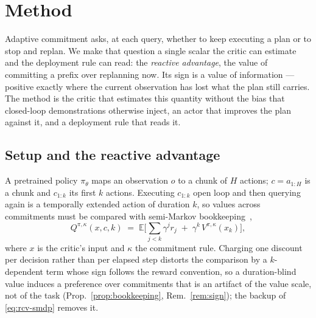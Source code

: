 \section{Method}
\label{sec:method}

Adaptive commitment asks, at each query, whether to keep executing a plan or to stop and replan.
We make that question a single scalar the critic can estimate and the deployment rule can read: the
\emph{reactive advantage}, the value of committing a prefix over replanning now. Its sign is a value
of information --- positive exactly where the current observation has lost what the plan still carries.
The method is the critic that estimates this quantity without the bias that closed-loop demonstrations
otherwise inject, an actor that improves the plan against it, and a deployment rule that reads it.

\subsection{Setup and the reactive advantage}
\label{sec:method:setup}

A pretrained policy $\pi_\theta$ maps an observation $o$ to a chunk of $H$ actions; $c=a_{1:H}$ is a
chunk and $c_{1:k}$ its first $k$ actions. Executing $c_{1:k}$ open loop and then querying again is a
temporally extended action of duration $k$, so values across commitments must be compared with
semi-Markov bookkeeping~\citep{sutton1999options,bradtke1994smdp},
\begin{equation}
\label{eq:rcv-smdp}
Q^{\pi,\kappa}(x, c, k) \;=\; \mathbb E\Big[\textstyle\sum_{j<k}\gamma^{j} r_j \;+\; \gamma^{k}\,
V^{\pi,\kappa}(x_k)\Big],
\end{equation}
where $x$ is the critic's input and $\kappa$ the commitment rule. Charging one discount per decision
rather than per elapsed step distorts the comparison by a $k$-dependent term whose sign follows the
reward convention, so a duration-blind value induces a preference over commitments that is an artifact
of the value scale, not of the task (Prop.~\ref{prop:bookkeeping}, Rem.~\ref{rem:sign}); the backup of
\eqref{eq:rcv-smdp} removes it.

